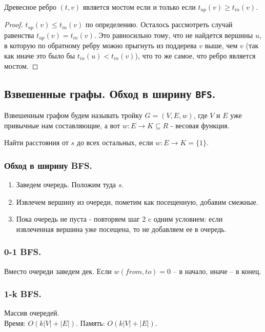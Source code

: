 \documentclass[a4paper,14pt]{article}
\begin{document}
    \begin{theorem}
        Древесное ребро $(t, v)$ является мостом если и только если $t_{up}(v) \geqslant t_{in}(v)$.    
    \end{theorem}
    \begin{proof}
        $t_{up}(v) \leqslant t_{in}(v)$ по определению. Осталось
рассмотреть случай равенства $t_{up}(v) = t_{in}(v)$.
Это равносильно тому, что не найдется вершины $u$, в которую по
обратному ребру можно прыгнуть из поддерева $v$ выше, чем $v$ (так
как иначе это было бы $t_{in}(u) < t_{in}(v)$), что то же самое, что ребро
является мостом.
    \end{proof}

    \subsection{Взвешенные графы. Обход в ширину \texttt{BFS}.}
    \label{subsec:bfs}
    \begin{Def}
        Взвешенным графом будем называть тройку $G = (V, E,w)$, где $V$ и $E$ уже привычные нам составляющие, а вот $w: E \rightarrow K \subseteq R$ - весовая функция.
    \end{Def}
    \begin{problem}
        Найти расстояния от $s$ до всех остальных, если $w : E \rightarrow K = \{1\}$.
    \end{problem}

    \subsubsection*{Обход в ширину BFS.}
    \begin{enumerate}
        \item Заведем очередь. Положим туда $s$.
        \item Извлечем вершину из очереди, пометим как посещенную, добавим смежные.
        \item Пока очередь не пуста - повторяем шаг 2 c одним условием: если
        извлеченная вершина уже посещена, то не добавляем ее в
        очередь.
    \end{enumerate}
    \subsubsection*{0-1 BFS.}
    Вместо очереди заведем дек. Если $w(from, to)=0$ -- в начало, иначе -- в конец.
    \subsubsection*{1-k BFS.}
    Массив очередей. \\
    Время: $O(k|V|+|E|)$. Память: $O(k|V|+|E|)$.
\end{document}
